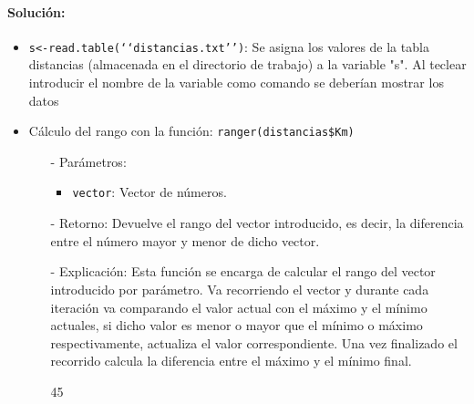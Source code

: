 \documentclass[a4paper, 12pt]{article}
\begin{document}
	\paragraph{Solución:}
	\begin{itemize}
		\item \texttt{s<-read.table(‘‘distancias.txt’’)}: Se asigna los valores de la tabla distancias (almacenada en el directorio de trabajo) a la variable "s". Al teclear introducir el nombre de la variable como comando se deberían mostrar los datos
		
		\item Cálculo del rango con la función: \texttt{ranger(distancias\$Km)}
		\begin{itemize}
			\item[-] Parámetros:
			\begin{itemize}
				\item \texttt{vector}: Vector de números.
			\end{itemize}
			
			\item[-]  Retorno: Devuelve el rango del vector introducido, es decir, la diferencia entre el número mayor y menor de dicho vector.
			
			\item[-] Explicación: Esta función se encarga de calcular el rango del vector introducido por parámetro. Va recorriendo el vector y durante cada iteración va comparando el valor actual con el máximo y el mínimo actuales, si dicho valor es menor o mayor que el mínimo o máximo respectivamente, actualiza el valor correspondiente. Una vez finalizado el recorrido calcula la diferencia entre el máximo y el mínimo final.
\begin{Schunk}
\begin{Soutput}
[1] 45
\end{Soutput}
\end{Schunk}
		\end{itemize} 
		

\end{itemize}
\end{document}
